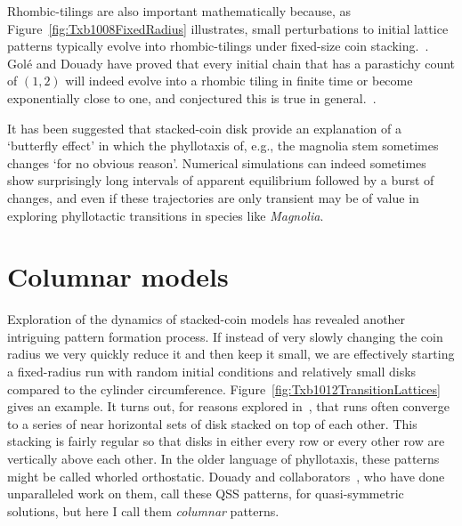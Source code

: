 Rhombic-tilings are also important mathematically because, as Figure~\ref{fig:Txb1008FixedRadius} illustrates, small perturbations to initial lattice patterns typically evolve into rhombic-tilings under fixed-size coin stacking.~\autocite{atelaRhombicTilingsPrimordia2017}.
Golé and Douady have proved that every initial chain that has a parastichy count of $(1,2)$ will indeed evolve into a rhombic tiling in finite time or become exponentially close to one, and conjectured 
this is true in general.~\autocite{goleConvergenceDiskStacking2020}.

It has been suggested that stacked-coin disk provide an explanation of a `butterfly effect' in which the phyllotaxis of, e.g., the magnolia stem sometimes changes `for no obvious reason'\autocite{zagorska-marekSignificanceGandLdislocations2016}. Numerical simulations can indeed sometimes show surprisingly long intervals of apparent equilibrium followed by a burst of changes, and even if these trajectories
are only transient may be of value in exploring phyllotactic transitions in species like \textit{Magnolia}.

\section{Columnar models}
\label{sec:columns}

Exploration of the dynamics of stacked-coin models has revealed another intriguing pattern formation process. If instead of very slowly changing the coin radius we very quickly reduce it and then keep it small, we are effectively starting a fixed-radius run with random initial conditions and relatively small disks compared to the cylinder circumference. Figure~\ref{fig:Txb1012TransitionLattices} gives an example.
It turns out, for reasons explored in~\autocite{goleFibonacciQuasisymmetricPhyllotaxis2016}, that
runs often converge to a series of near horizontal sets of disk stacked on top of each other. This stacking is fairly regular so that disks in either every row or every other row are vertically above each other. In the older language of phyllotaxis, these patterns might be called whorled orthostatic.  Douady and collaborators~\cite{goleConvergenceDiskStacking2020}, who have done unparalleled work on them,  call these QSS patterns, for quasi-symmetric solutions, but here I call them \textit{columnar} patterns.

